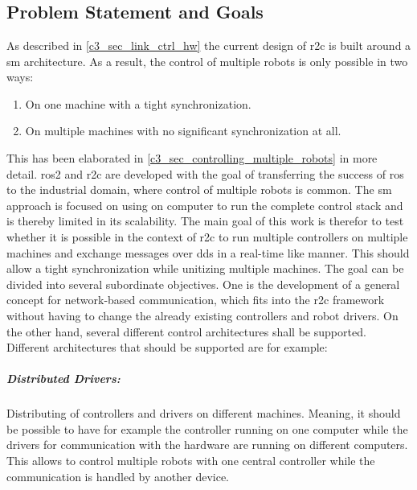 \chapter{}
\label{sec:concept}

\section{Problem Statement and Goals}
As described in \autoref{c3_sec_link_ctrl_hw} the current design of \gls{r2c} is built around a \gls{sm} architecture. As a result, the control of multiple robots is only possible in two ways: 
\begin{enumerate}
    \item On one machine with a tight synchronization. 
    \item On multiple machines with no significant synchronization at all.
\end{enumerate}
This has been elaborated in \autoref{c3_sec_controlling_multiple_robots} in more detail. \gls{ros2} and \gls{r2c} are developed with the goal of transferring the success of \gls{ros} to the industrial domain, where control of multiple robots is common. The \gls{sm} approach is focused on using on computer to run the complete control stack and is thereby limited in its scalability. The main goal of this work is therefor to  test whether it is possible in the context of \gls{r2c} to run multiple controllers on multiple machines and exchange messages over \gls{dds} in a real-time like manner. This should allow a tight synchronization while unitizing multiple machines.\newline
The goal can be divided into several subordinate objectives. One is the development of a general concept for network-based communication, which fits into the \gls{r2c} framework without having to change the already existing controllers and robot drivers. On the other hand, several different control architectures shall be supported. Different architectures that should be supported are for example:
\paragraph{Distributed Drivers:}
 Distributing of controllers and drivers on different machines. Meaning, it should be possible to have for example the controller running on one computer while the drivers for communication with the hardware are running on different computers. This allows to control multiple robots with one central controller while the communication is handled by another device.
